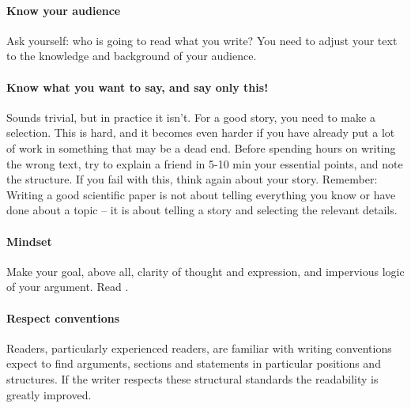 \documentclass{tufte-book}
\begin{document}

\paragraph{Know your audience} Ask yourself: who is going to read what you write?  You need to adjust your text to the knowledge and background of your audience. 


\paragraph{Know what you want to say, and say only this!} Sounds trivial, but in practice it isn't. For a good story, you need to make a selection. This is hard, and it becomes even harder if you have already put a lot of work in something that may be a dead end. Before spending hours on writing the wrong text, try to explain a friend in 5-10 min your essential points, and note the structure. If you fail with this, think again about your story. Remember: Writing a good scientific paper is not about telling everything you know or have done about a topic -- it is about telling a story and selecting the relevant details. 

\paragraph{Mindset} Make your goal, above all, clarity of thought and expression, and impervious logic of your argument. Read \citet{Woodford-Sounderthinkingthrough-1967}.

\paragraph{Respect conventions} Readers, particularly experienced readers, are familiar with writing conventions expect to find arguments, sections and statements in particular positions and structures. If the writer respects these structural standards the readability is greatly improved. 
\end{document}
